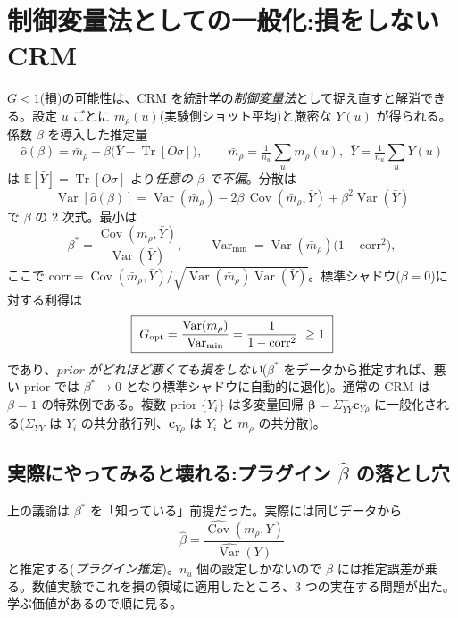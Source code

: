 \documentclass[11pt,a4paper]{ltjsarticle}
\newcommand{\Tr}{\operatorname{Tr}}
\newcommand{\Var}{\operatorname{Var}}
\newcommand{\Cov}{\operatorname{Cov}}
\begin{document}
\section{制御変量法としての一般化:損をしない CRM}
\label{sec:cv-t}

$G<1$(損)の可能性は、CRM を統計学の\emph{制御変量法}として捉え直すと解消できる。設定 $u$ ごとに $m_\rho(u)$(実験側ショット平均)と厳密な $Y(u)$ が得られる。係数 $\beta$ を導入した推定量
\begin{equation}
  \hat o(\beta)=\bar m_\rho - \beta\bigl(\bar Y - \Tr[O\sigma]\bigr),\qquad
  \bar m_\rho=\tfrac1{n_u}\!\sum_u m_\rho(u),\ \ \bar Y=\tfrac1{n_u}\!\sum_u Y(u)
\end{equation}
は $\mathbb E[\bar Y]=\Tr[O\sigma]$ より\emph{任意の $\beta$ で不偏}。分散は
\begin{equation}
  \Var[\hat o(\beta)] = \Var(\bar m_\rho) - 2\beta\,\Cov(\bar m_\rho,\bar Y) + \beta^2\Var(\bar Y)
\end{equation}
で $\beta$ の 2 次式。最小は
\begin{equation}
  \beta^\ast=\frac{\Cov(\bar m_\rho,\bar Y)}{\Var(\bar Y)},\qquad
  \Var_{\min}=\Var(\bar m_\rho)\bigl(1-\mathrm{corr}^2\bigr),
\end{equation}
ここで $\mathrm{corr}=\Cov(\bar m_\rho,\bar Y)/\sqrt{\Var(\bar m_\rho)\Var(\bar Y)}$。標準シャドウ($\beta=0$)に対する利得は
\begin{equation}
  \boxed{\ G_{\rm opt}=\frac{\Var(\bar m_\rho)}{\Var_{\min}}=\frac{1}{1-\mathrm{corr}^2}\ \ge 1\ }
\end{equation}
であり、\emph{prior がどれほど悪くても損をしない}($\beta^\ast$ をデータから推定すれば、悪い prior では $\beta^\ast\to0$ となり標準シャドウに自動的に退化)。通常の CRM は $\beta=1$ の特殊例である。複数 prior $\{Y_i\}$ は多変量回帰 $\boldsymbol\beta=\Sigma_{YY}^{+}\mathbf c_{Y\rho}$ に一般化される($\Sigma_{YY}$ は $Y_i$ の共分散行列、$\mathbf c_{Y\rho}$ は $Y_i$ と $m_\rho$ の共分散)。

\subsection{実際にやってみると壊れる:プラグイン $\hat\beta$ の落とし穴}
\label{sec:betapitfall}

上の議論は $\beta^\ast$ を「知っている」前提だった。実際には同じデータから
\begin{equation}
  \hat\beta = \frac{\widehat{\Cov}(m_\rho,Y)}{\widehat{\Var}(Y)}
\end{equation}
と推定する(\emph{プラグイン推定})。$n_u$ 個の設定しかないので $\hat\beta$ には推定誤差が乗る。数値実験でこれを損の領域に適用したところ、3 つの実在する問題が出た。学ぶ価値があるので順に見る。
\end{document}
